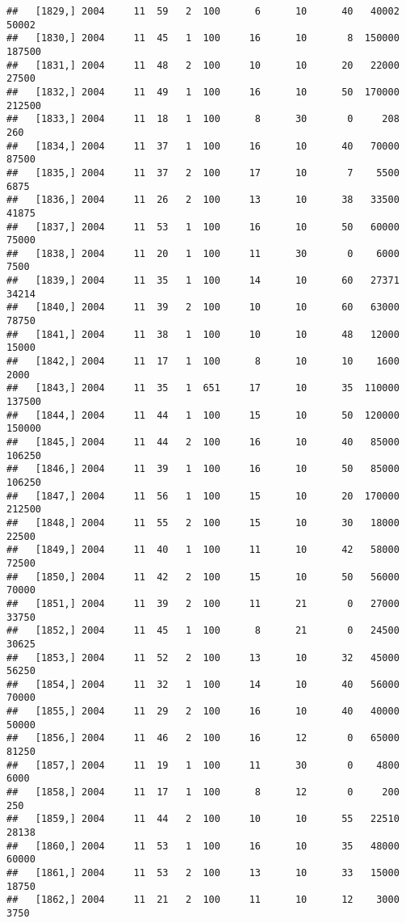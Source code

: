 \documentclass{article}\usepackage[]{graphicx}\usepackage[]{color}
\makeatletter
\newenvironment{kframe}{%
 \def\at@end@of@kframe{}%
 \ifinner\ifhmode%
  \def\at@end@of@kframe{\end{minipage}}%
  \begin{minipage}{\columnwidth}%
 \fi\fi%
 \def\FrameCommand##1{\hskip\@totalleftmargin \hskip-\fboxsep
 \colorbox{shadecolor}{##1}\hskip-\fboxsep
     \hskip-\linewidth \hskip-\@totalleftmargin \hskip\columnwidth}%
 \MakeFramed {\advance\hsize-\width
   \@totalleftmargin\z@ \linewidth\hsize
   \@setminipage}}%
 {\par\unskip\endMakeFramed%
 \at@end@of@kframe}
\newenvironment{knitrout}{}{} %
\makeatother
\begin{document}
\begin{knitrout}
\begin{kframe}
\begin{verbatim}
##   [1829,] 2004     11  59   2  100      6      10      40   40002   50002
##   [1830,] 2004     11  45   1  100     16      10       8  150000  187500
##   [1831,] 2004     11  48   2  100     10      10      20   22000   27500
##   [1832,] 2004     11  49   1  100     16      10      50  170000  212500
##   [1833,] 2004     11  18   1  100      8      30       0     208     260
##   [1834,] 2004     11  37   1  100     16      10      40   70000   87500
##   [1835,] 2004     11  37   2  100     17      10       7    5500    6875
##   [1836,] 2004     11  26   2  100     13      10      38   33500   41875
##   [1837,] 2004     11  53   1  100     16      10      50   60000   75000
##   [1838,] 2004     11  20   1  100     11      30       0    6000    7500
##   [1839,] 2004     11  35   1  100     14      10      60   27371   34214
##   [1840,] 2004     11  39   2  100     10      10      60   63000   78750
##   [1841,] 2004     11  38   1  100     10      10      48   12000   15000
##   [1842,] 2004     11  17   1  100      8      10      10    1600    2000
##   [1843,] 2004     11  35   1  651     17      10      35  110000  137500
##   [1844,] 2004     11  44   1  100     15      10      50  120000  150000
##   [1845,] 2004     11  44   2  100     16      10      40   85000  106250
##   [1846,] 2004     11  39   1  100     16      10      50   85000  106250
##   [1847,] 2004     11  56   1  100     15      10      20  170000  212500
##   [1848,] 2004     11  55   2  100     15      10      30   18000   22500
##   [1849,] 2004     11  40   1  100     11      10      42   58000   72500
##   [1850,] 2004     11  42   2  100     15      10      50   56000   70000
##   [1851,] 2004     11  39   2  100     11      21       0   27000   33750
##   [1852,] 2004     11  45   1  100      8      21       0   24500   30625
##   [1853,] 2004     11  52   2  100     13      10      32   45000   56250
##   [1854,] 2004     11  32   1  100     14      10      40   56000   70000
##   [1855,] 2004     11  29   2  100     16      10      40   40000   50000
##   [1856,] 2004     11  46   2  100     16      12       0   65000   81250
##   [1857,] 2004     11  19   1  100     11      30       0    4800    6000
##   [1858,] 2004     11  17   1  100      8      12       0     200     250
##   [1859,] 2004     11  44   2  100     10      10      55   22510   28138
##   [1860,] 2004     11  53   1  100     16      10      35   48000   60000
##   [1861,] 2004     11  53   2  100     13      10      33   15000   18750
##   [1862,] 2004     11  21   2  100     11      10      12    3000    3750

\end{verbatim}
\end{kframe}
\end{knitrout}
\end{document}
